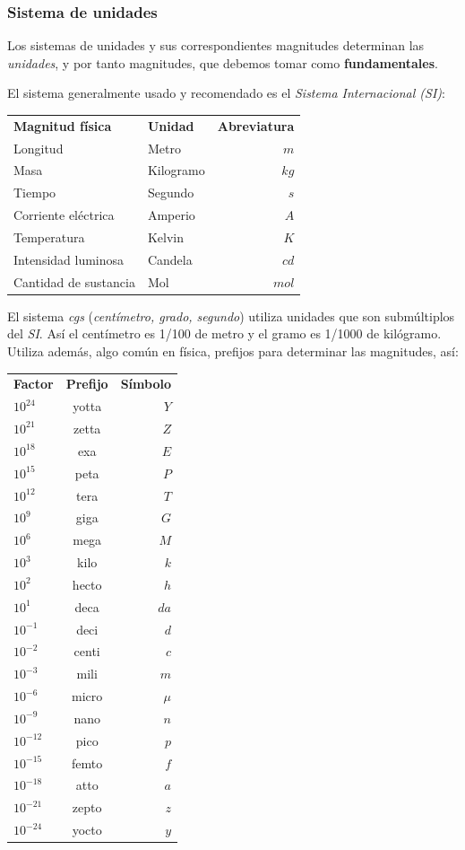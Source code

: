 \documentclass[11pt, oneside, titlepage]{article}
\begin{document}
\subsubsection{Sistema de unidades}
Los sistemas de unidades y sus correspondientes magnitudes determinan las \emph{unidades}, y por tanto magnitudes, que debemos tomar como \textbf{fundamentales}.

El sistema generalmente usado y recomendado es el \emph{Sistema Internacional (SI)}:

\begin{center}\begin{tabular}{llr}
	\textbf{Magnitud física} & \textbf{Unidad} & \textbf{Abreviatura}\\
	Longitud & Metro & $m$\\
	Masa & Kilogramo & $kg$\\
	Tiempo & Segundo & $s$\\
	Corriente eléctrica & Amperio & $A$\\
	Temperatura & Kelvin & $K$\\
	Intensidad luminosa & Candela & $cd$ \\
	Cantidad de sustancia & Mol & $mol$\\
\end{tabular}\end{center}

El sistema \emph{cgs} (\emph{centímetro, grado, segundo}) utiliza unidades que son submúltiplos del \emph{SI}. Así el centímetro es 1/100 de metro y el gramo es 1/1000 de kilógramo. Utiliza además, algo común en física, prefijos para determinar las magnitudes, así:

\begin{center}\begin{tabular}{lcr}
	\textbf{Factor} & \textbf{Prefijo} & \textbf{Símbolo}\\
	$10^{24}$ & yotta & $Y$\\
	$10^{21}$ & zetta & $Z$\\
	$10^{18}$ & exa & $E$\\
	$10^{15}$ & peta & $P$\\
	$10^{12}$ & tera & $T$\\
	$10^9$ & giga & $G$\\
	$10^6$ & mega & $M$\\
	$10^3$ & kilo & $k$\\
	$10^2$ & hecto & $h$\\
	$10^1$ & deca & $da$\\
	$10^{-1}$ & deci & $d$\\
	$10^{-2}$ & centi & $c$\\
	$10^{-3}$ & mili & $m$\\
	$10^{-6}$ & micro & $\mu$\\
	$10^{-9}$ & nano & $n$\\
	$10^{-12}$ & pico & $p$\\
	$10^{-15}$ & femto & $f$\\
	$10^{-18}$ & atto & $a$\\
	$10^{-21}$ & zepto & $z$\\
	$10^{-24}$ & yocto & $y$\\
\end{tabular}\end{center}
\end{document}
